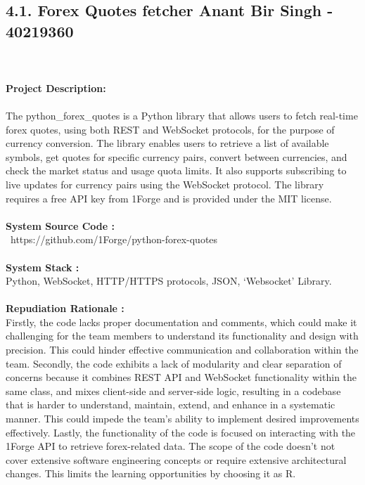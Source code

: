 \documentclass[letterpaper, 11pt]{report}
\begin{document}
\subsection*{4.1. Forex Quotes fetcher \hfill \normalsize{Anant Bir Singh  - 40219360}} \\
\\
\normalsize {\textbf{Project Description:}} \\
\\
\normalsize { The python\_forex\_quotes is a Python library that allows users to fetch real-time forex quotes, using both REST and WebSocket protocols, for the purpose of currency conversion. The library enables users to retrieve a list of available symbols, get quotes for specific currency pairs, convert between currencies, and check the market status and usage quota limits. It also supports subscribing to live updates for currency pairs using the WebSocket protocol. The library requires a free API key from 1Forge and is provided under the MIT license.}\\
\\
\normalsize{\textbf{System Source Code :}} \\
\normalsize{\ https://github.com/1Forge/python-forex-quotes }\\
\\
\normalsize{\textbf{System Stack :}}\\
\normalsize{ Python, WebSocket, HTTP/HTTPS protocols, JSON, ‘Websocket’ Library.}\\
\\
\normalsize{\textbf{Repudiation Rationale : }}\\
\normalsize{Firstly, the code lacks proper documentation and comments, which could make it challenging for the team members to understand its functionality and design with precision. This could hinder effective communication and collaboration within the team.
 Secondly, the code exhibits a lack of modularity and clear separation of concerns because it combines REST API and WebSocket functionality within the same class, and mixes client-side and server-side logic, resulting in a codebase that is harder to understand, maintain, extend, and enhance in a systematic manner. This could impede the team's ability to implement desired improvements effectively. 
Lastly, the functionality of the code is focused on interacting with the 1Forge API to retrieve forex-related data. The scope of the code doesn’t not cover extensive software engineering concepts or require extensive architectural changes. This limits the learning opportunities by choosing it as R.
}
\\
\end{document}
